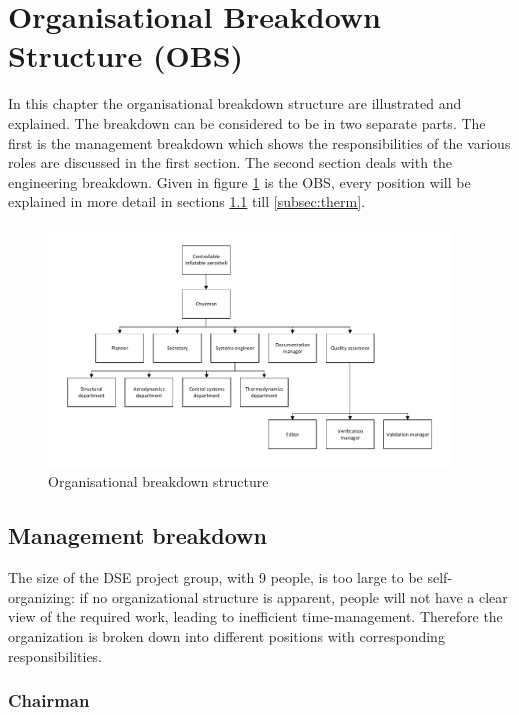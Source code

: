 \section{Organisational Breakdown Structure (OBS)}\label{cha:OBS}
In this chapter the organisational breakdown structure are illustrated and explained. The breakdown can be considered to be in two separate parts. The first is the management breakdown which shows the responsibilities of the various roles are discussed in the first section. The second section deals with the engineering breakdown. Given in figure \ref{fig:OBS} is the OBS, every position will be explained in more detail in sections \ref{subsec:management} till \ref{subsec:therm}.

\begin{figure}[h]
\centering
\includegraphics[width=0.95\textwidth]{./Figure/OBS.pdf}
\caption{Organisational breakdown structure} \label{fig:OBS}
\end{figure}

\subsection{Management breakdown}\label{subsec:management}
The size of the DSE project group, with 9 people, is too large to be self-organizing: if no organizational structure is apparent, people will not have a clear view of the required work, leading to inefficient time-management. Therefore the organization is broken down into different positions with corresponding responsibilities.


\subsubsection{Chairman}\label{subsec:Chairman}


